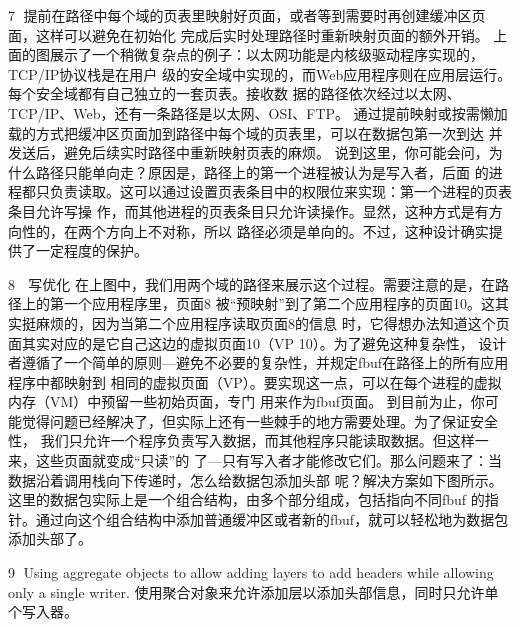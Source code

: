                                                         7
提前在路径中每个域的页表里映射好页面，或者等到需要时再创建缓冲区页面，这样可以避免在初始化
完成后实时处理路径时重新映射页面的额外开销。
上面的图展示了一个稍微复杂点的例子：以太网功能是内核级驱动程序实现的，TCP/IP协议栈是在用户
级的安全域中实现的，而Web应用程序则在应用层运行。每个安全域都有自己独立的一套页表。接收数
据的路径依次经过以太网、TCP/IP、Web，还有一条路径是以太网、OSI、FTP。
通过提前映射或按需懒加载的方式把缓冲区页面加到路径中每个域的页表里，可以在数据包第一次到达
并发送后，避免后续实时路径中重新映射页表的麻烦。
说到这里，你可能会问，为什么路径只能单向走？原因是，路径上的第一个进程被认为是写入者，后面
的进程都只负责读取。这可以通过设置页表条目中的权限位来实现：第一个进程的页表条目允许写操
作，而其他进程的页表条目只允许读操作。显然，这种方式是有方向性的，在两个方向上不对称，所以
路径必须是单向的。不过，这种设计确实提供了一定程度的保护。




                                               8
                      写优化
在上图中，我们用两个域的路径来展示这个过程。需要注意的是，在路径上的第一个应用程序里，页面8
被“预映射”到了第二个应用程序的页面10。这其实挺麻烦的，因为当第二个应用程序读取页面8的信息
时，它得想办法知道这个页面其实对应的是它自己这边的虚拟页面10（VP 10）。为了避免这种复杂性，
设计者遵循了一个简单的原则—避免不必要的复杂性，并规定fbuf在路径上的所有应用程序中都映射到
相同的虚拟页面（VP）。要实现这一点，可以在每个进程的虚拟内存（VM）中预留一些初始页面，专门
用来作为fbuf页面。
到目前为止，你可能觉得问题已经解决了，但实际上还有一些棘手的地方需要处理。为了保证安全性，
我们只允许一个程序负责写入数据，而其他程序只能读取数据。但这样一来，这些页面就变成“只读”的
了—只有写入者才能修改它们。那么问题来了：当数据沿着调用栈向下传递时，怎么给数据包添加头部
呢？解决方案如下图所示。这里的数据包实际上是一个组合结构，由多个部分组成，包括指向不同fbuf
的指针。通过向这个组合结构中添加普通缓冲区或者新的fbuf，就可以轻松地为数据包添加头部了。




                                                9
Using aggregate objects to allow adding layers to add headers while allowing only a single writer.
              使用聚合对象来允许添加层以添加头部信息，同时只允许单个写入器。

